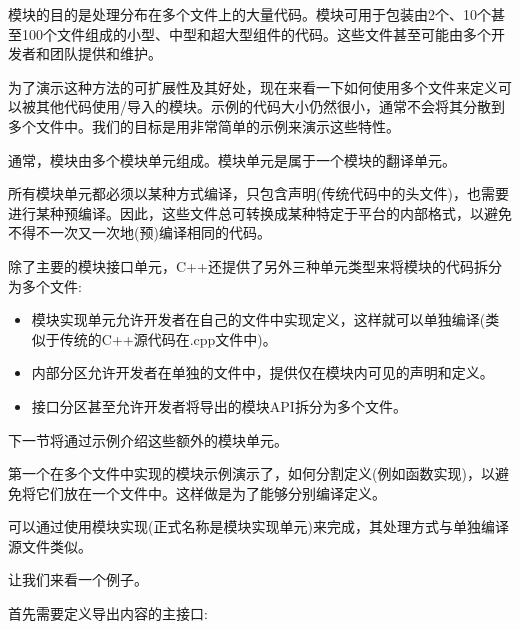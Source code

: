 

模块的目的是处理分布在多个文件上的大量代码。模块可用于包装由2个、10个甚至100个文件组成的小型、中型和超大型组件的代码。这些文件甚至可能由多个开发者和团队提供和维护。

为了演示这种方法的可扩展性及其好处，现在来看一下如何使用多个文件来定义可以被其他代码使用/导入的模块。示例的代码大小仍然很小，通常不会将其分散到多个文件中。我们的目标是用非常简单的示例来演示这些特性。


通常，模块由多个模块单元组成。模块单元是属于一个模块的翻译单元。

所有模块单元都必须以某种方式编译，只包含声明(传统代码中的头文件)，也需要进行某种预编译。因此，这些文件总可转换成某种特定于平台的内部格式，以避免不得不一次又一次地(预)编译相同的代码。

除了主要的模块接口单元，C++还提供了另外三种单元类型来将模块的代码拆分为多个文件:

\begin{itemize}
\item
模块实现单元允许开发者在自己的文件中实现定义，这样就可以单独编译(类似于传统的C++源代码在.cpp文件中)。

\item
内部分区允许开发者在单独的文件中，提供仅在模块内可见的声明和定义。

\item
接口分区甚至允许开发者将导出的模块API拆分为多个文件。
\end{itemize}

下一节将通过示例介绍这些额外的模块单元。


第一个在多个文件中实现的模块示例演示了，如何分割定义(例如函数实现)，以避免将它们放在一个文件中。这样做是为了能够分别编译定义。

可以通过使用模块实现(正式名称是模块实现单元)来完成，其处理方式与单独编译源文件类似。

让我们来看一个例子。


首先需要定义导出内容的主接口:


